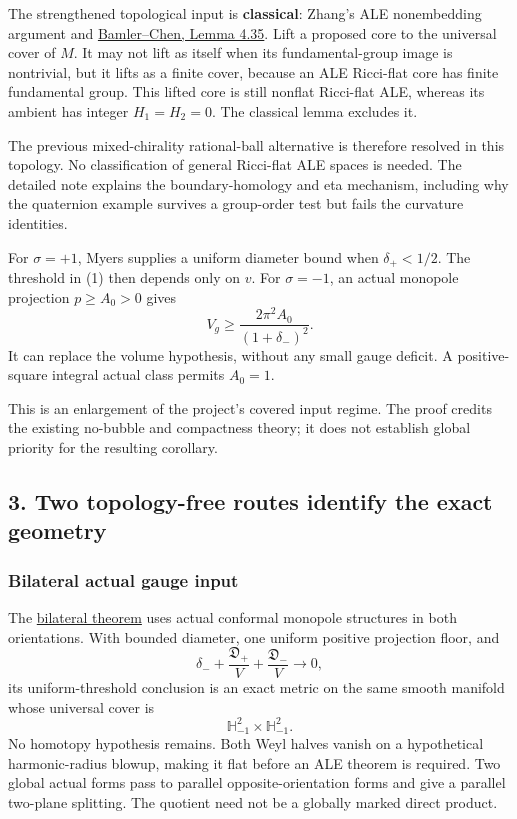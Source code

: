 \documentclass[
  11pt,
]{article}
\begin{document}
The strengthened topological input is \textbf{classical}: Zhang's ALE
nonembedding argument and
\href{https://arxiv.org/pdf/2305.03154v3}{Bamler--Chen, Lemma 4.35}.
Lift a proposed core to the universal cover of \(M\). It may not lift as
itself when its fundamental-group image is nontrivial, but it lifts as a
finite cover, because an ALE Ricci-flat core has finite fundamental
group. This lifted core is still nonflat Ricci-flat ALE, whereas its
ambient has integer \(H_1=H_2=0\). The classical lemma excludes it.

The previous mixed-chirality rational-ball alternative is therefore
resolved in this topology. No classification of general Ricci-flat ALE
spaces is needed. The detailed note explains the boundary-homology and
eta mechanism, including why the quaternion example survives a
group-order test but fails the curvature identities.

For \(\sigma=+1\), Myers supplies a uniform diameter bound when
\(\delta_+<1/2\). The threshold in (1) then depends only on \(v\). For
\(\sigma=-1\), an actual monopole projection \(p\ge A_0>0\) gives \[
 V_g\ge\frac{2\pi^2A_0}{(1+\delta_-)^2}.
\] It can replace the volume hypothesis, without any small gauge
deficit. A positive-square integral actual class permits \(A_0=1\).

This is an enlargement of the project's covered input regime. The proof
credits the existing no-bubble and compactness theory; it does not
establish global priority for the resulting corollary.

\hypertarget{two-topology-free-routes-identify-the-exact-geometry}{%
\subsection{3. Two topology-free routes identify the exact
geometry}\label{two-topology-free-routes-identify-the-exact-geometry}}

\hypertarget{bilateral-actual-gauge-input}{%
\subsubsection{Bilateral actual gauge
input}\label{bilateral-actual-gauge-input}}

The \href{20260924_bilateral_realization.md}{bilateral theorem} uses
actual conformal monopole structures in both orientations. With bounded
diameter, one uniform positive projection floor, and \[
 \delta_-+\frac{\mathfrak D_+}{V}
              +\frac{\mathfrak D_-}{V}\longrightarrow0,
\] its uniform-threshold conclusion is an exact metric on the same
smooth manifold whose universal cover is \[
                       \mathbb H^2_{-1}\times\mathbb H^2_{-1}.
\] No homotopy hypothesis remains. Both Weyl halves vanish on a
hypothetical harmonic-radius blowup, making it flat before an ALE
theorem is required. Two global actual forms pass to parallel
opposite-orientation forms and give a parallel two-plane splitting. The
quotient need not be a globally marked direct product.
\end{document}
